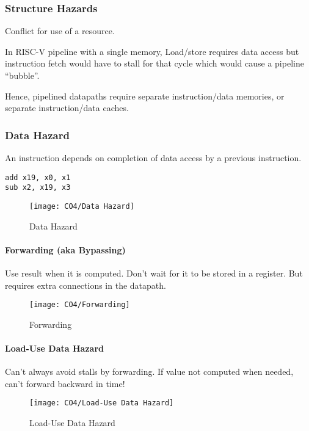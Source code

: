 \subsubsection{Structure Hazards}
Conflict for use of a resource. 

In RISC-V pipeline with a single memory, Load/store requires data access but instruction fetch would have to stall for that cycle which would cause a pipeline ``bubble''. 

Hence, pipelined datapaths require separate instruction/data memories, or separate instruction/data caches. 

\subsubsection{Data Hazard}
An instruction depends on completion of data access by a previous instruction. 

\begin{lstlisting}[language={[x86masm]Assembler}]
add x19, x0, x1
sub x2, x19, x3
\end{lstlisting}

\begin{figure}[!htb]
    \centering
    \texttt{[image: CO4/Data Hazard]}
    \caption{Data Hazard}
\end{figure}

\paragraph{Forwarding (aka Bypassing)}
Use result when it is computed. Don't wait for it to be stored in a register. But requires extra connections in the datapath. 

\begin{figure}[!htb]
    \centering
    \texttt{[image: CO4/Forwarding]}
    \caption{Forwarding}
\end{figure}

\paragraph{Load-Use Data Hazard}

Can't always avoid stalls by forwarding. If value not computed when needed, can't forward backward in time!

\begin{figure}[!htb]
    \centering
    \texttt{[image: CO4/Load-Use Data Hazard]}
    \caption{Load-Use Data Hazard}
\end{figure}

